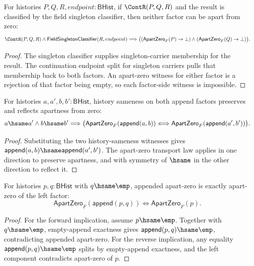\begin{theorem}
\label{thm:field-apartzero-continuation-singleton-result-factor-absurd}
For histories $P,Q,R,endpoint:\mathsf{BHist}$, if $\ContR(P,Q,R)$ and the
result is classified by the field singleton classifier, then neither factor can
be apart from zero:
$$
\ContR(P,Q,R)\land
\mathsf{FieldSingletonClassifier}(R,endpoint)
\Longrightarrow
\bigl((\mathsf{ApartZero}_F(P)\to\bot)
\land
(\mathsf{ApartZero}_F(Q)\to\bot)\bigr).
$$
\end{theorem}
\begin{proof}
The singleton classifier supplies singleton-carrier membership for the result.
The continuation endpoint split for singleton carriers pulls that membership
back to both factors. An apart-zero witness for either factor is a rejection of
that factor being empty, so each factor-side witness is impossible.
\end{proof}

\begin{theorem}
\label{thm:field-apartzero-append-hsame-congr-iff}
For histories $a,a',b,b':\mathsf{BHist}$, history sameness on both append
factors preserves and reflects apartness from zero:
$$
a\hsame a'\land b\hsame b'
\Longrightarrow
\bigl(\mathsf{ApartZero}_F(\mathsf{append}(a,b))
\Longleftrightarrow
\mathsf{ApartZero}_F(\mathsf{append}(a',b'))\bigr).
$$
\end{theorem}
\begin{proof}
Substituting the two history-sameness witnesses gives
$\mathsf{append}(a,b)\hsame\mathsf{append}(a',b')$. The apart-zero transport
law applies in one direction to preserve apartness, and with symmetry of
$\hsame$ in the other direction to reflect it.
\end{proof}

\begin{theorem}
\label{thm:field-apartzero-append-right-empty-iff}
For histories $p,q:\mathsf{BHist}$ with $q\hsame\emp$, appended apart-zero
is exactly apart-zero of the left factor:
$$
\mathsf{ApartZero}_F(\mathsf{append}(p,q))
\Longleftrightarrow
\mathsf{ApartZero}_F(p).
$$
\end{theorem}
\begin{proof}
For the forward implication, assume $p\hsame\emp$. Together with
$q\hsame\emp$, empty-append exactness gives
$\mathsf{append}(p,q)\hsame\emp$, contradicting appended apart-zero. For the
reverse implication, any equality
$\mathsf{append}(p,q)\hsame\emp$ splits by empty-append exactness, and the
left component contradicts apart-zero of $p$.
\end{proof}

